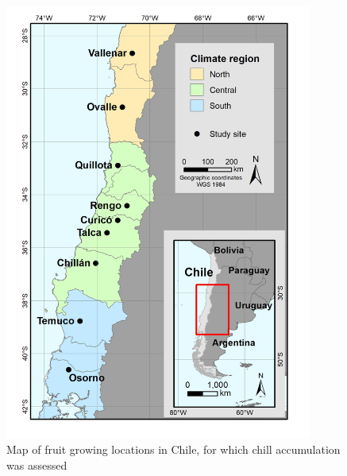 \documentclass[
]{book}
\begin{document}
\begin{figure}
\centering
\includegraphics[width=0.9\textwidth,height=\textheight]{pictures/Chile_chill_map.png}
\caption{Map of fruit growing locations in Chile, for which chill accumulation was assessed}
\end{figure}
\end{document}
